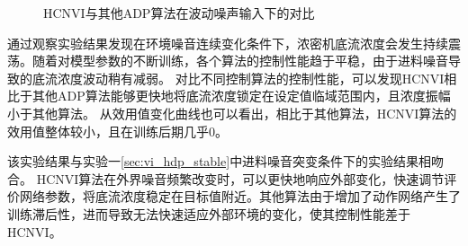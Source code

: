 \begin{figure}[ht]
\centering 
\caption{HCNVI与其他ADP算法在波动噪声输入下的对比}
    \label{fig:noise_HCNVI_HDP}
\end{figure}


通过观察实验结果发现在环境噪音连续变化条件下，浓密机底流浓度会发生持续震荡。随着对模型参数的不断训练，各个算法的控制性能趋于平稳，由于进料噪音导致的底流浓度波动稍有减弱。
对比不同控制算法的控制性能，可以发现HCNVI相比于其他ADP算法能够更快地将底流浓度锁定在设定值临域范围内，且浓度振幅小于其他算法。
从效用值变化曲线也可以看出，相比于其他算法，HCNVI算法的效用值整体较小，且在训练后期几乎0。

该实验结果与实验一\ref{sec:vi_hdp_stable}中进料噪音突变条件下的实验结果相吻合。
HCNVI算法在外界噪音频繁改变时，可以更快地响应外部变化，快速调节评价网络参数，将底流浓度稳定在目标值附近。其他算法由于增加了动作网络产生了训练滞后性，进而导致无法快速适应外部环境的变化，使其控制性能差于HCNVI。

